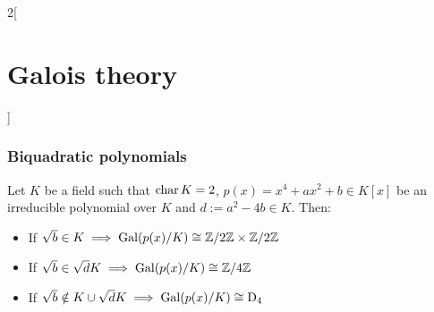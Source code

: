 \documentclass[../../../main.tex]{subfiles}
\begin{document}
\begin{multicols}{2}[\section{Galois theory}]
  \subsubsection{Biquadratic polynomials}
  \begin{theorem}
    Let $K$ be a field such that $\operatorname{char} K=2$, $p(x)=x^4+ax^2+b\in K[x]$ be an irreducible polynomial over $K$ and $d:=a^2-4b\in K$. Then:
    \begin{itemize}
      \item If $\sqrt{b}\in K\implies\Gal(p(x)/K)\cong\quot{\ZZ}{2\ZZ}\times\quot{\ZZ}{2\ZZ}$
      \item If $\sqrt{b}\in \sqrt{d}K\implies\Gal(p(x)/K)\cong\quot{\ZZ}{4\ZZ}$
      \item If $\sqrt{b}\notin K\cup\sqrt{d}K\implies\operatorname{Gal}(p(x)/K)\cong\text{D}_4$
    \end{itemize}
  \end{theorem}
\end{multicols}
\end{document}
